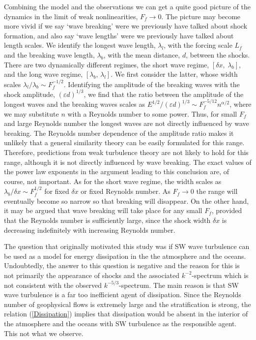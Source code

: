\documentclass{jfm}
\newcommand{\eps}{\varepsilon}
\begin{document}
Combining the model and the observations we can get a quite good picture of the
dynamics in the limit of weak nonlinearities, $ F_{f} \rightarrow 0 $. The
picture may become more vivid if we say `wave breaking' were we previously have
talked about shock formation, and also say `wave lengths' were we previously
have talked about length scales. We identify the longest wave length, $
\lambda_l $, with the forcing scale $ L_f $ and the breaking wave length, $
\lambda_b $, with the mean distance, $ d $, between the shocks. There are two
dynamically different regimes, the short wave regime, $ [\delta x, \;
\lambda_b] $, and the long wave regime, $ [\lambda_b, \, \lambda_l] $. We first
consider the latter, whose width scales $ \lambda_{l} /\lambda_b \sim
F_f^{-1/2} $. Identifying the amplitude of the breaking waves with the shock
amplitude, $ (\eps d)^{1/3} $, we find that the ratio between the amplitude of
the longest waves and the breaking waves scales as $ E^{1/2}/(\eps d)^{1/3}
\sim F_{f}^{-5/12} n^{\alpha/2} $, where we may substitute $ n $ with a
Reynolds number to some power. Thus, for small $ F_f $ and large Reynolds
number the longest waves are not directly influenced by wave breaking. The
Reynolds number dependence of the amplitude ratio makes it unlikely that a
general similarity theory can be easily formulated for this range. Therefore,
predictions from weak turbulence theory \cite[for
example][]{ZakharovSagdeev1970} are not likely to hold for this range, although
it is not directly influenced by wave breaking. The exact values of the power
law exponents in the argument leading to this conclusion are, of course, not
important. As for the short wave regime, the width scales as $ \lambda_b
/\delta x \sim F_f^{1/2} $ for fixed $ \delta x $ or fixed Reynolds number. As
$ F_{f} \rightarrow 0 $ the range will eventually become so narrow so that
breaking will disappear. On the other hand, it may be argued that wave breaking
will take place for any small $ F_f $, provided that the Reynolds number is
sufficiently large, since the shock width $ \delta x $ is decreasing
indefinitely with increasing Reynolds number.

The question that originally motivated this study was if SW wave turbulence can
be used as a model for energy dissipation in the the atmosphere and the oceans.
Undoubtedly, the answer to this question is negative and the reason for this is
not primarily the appearance of shocks and the associated $ k^{-2} $-spectrum
which is not consistent with the observed $ k^{-5/3} $-spectrum. The main
reason is that SW wave turbulence is a far too inefficient agent of
dissipation. Since the Reynolds number of geophysical flows is extremely large
and the stratification is strong, the relation (\ref{Dissipation}) implies that
dissipation would be absent in the interior of the atmosphere and the oceans
with SW turbulence as the responsible agent. This not what we observe.
\end{document}
